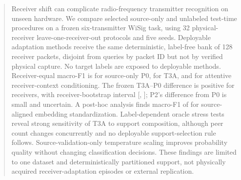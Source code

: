\begin{abstract}
Receiver shift can complicate radio-frequency transmitter recognition on unseen hardware. We compare selected source-only and unlabeled test-time procedures on a frozen six-transmitter WiSig task, using 32 physical-receiver leave-one-receiver-out protocols and five seeds. Deployable adaptation methods receive the same deterministic, label-free bank of 128 receiver packets, disjoint from queries by packet ID but not by verified physical capture. No target labels are exposed to deployable methods. Receiver-equal macro-F1 is  for source-only P0,  for T3A, and  for attentive receiver-context conditioning. The frozen T3A--P0 difference is positive for  receivers, with receiver-bootstrap interval [, ]; P2's difference from P0 is small and uncertain. A post-hoc analysis finds macro-F1 of  for source-aligned embedding standardization. Label-dependent oracle stress tests reveal strong sensitivity of T3A to support composition, although peer count changes concurrently and no deployable support-selection rule follows. Source-validation-only temperature scaling improves probability quality without changing classification decisions. These findings are limited to one dataset and deterministically partitioned support, not physically acquired receiver-adaptation episodes or external replication.
\end{abstract}
